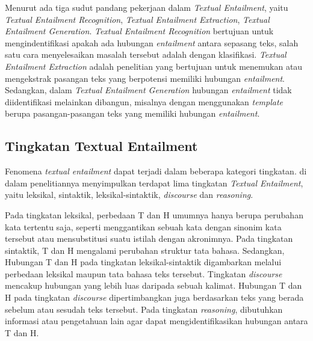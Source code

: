 Menurut \cite{Androutsopoulos:2010:SPT:1892211.1892215} ada tiga sudut pandang pekerjaan dalam \textit{Textual Entailment}, yaitu \textit{Textual Entailment Recognition}, \textit{Textual Entailment Extraction}, \textit{Textual Entailment Generation}. \textit{Textual Entailment Recognition} bertujuan untuk mengindentifikasi apakah ada hubungan \textit{entailment} antara sepasang teks, salah satu cara menyelesaikan masalah tersebut adalah dengan klasifikasi. \textit{Textual Entailment Extraction} adalah penelitian yang bertujuan untuk menemukan atau mengekstrak pasangan teks yang berpotensi memiliki hubungan \textit{entailment}. Sedangkan, dalam \textit{Textual Entailment Generation} hubungan \textit{entailment} tidak diidentifikasi melainkan dibangun, misalnya dengan menggunakan \textit{template} berupa pasangan-pasangan teks yang memiliki hubungan \textit{entailment}.

	\subsection{Tingkatan Textual Entailment}
	Fenomena \textit{textual entailment} dapat terjadi dalam beberapa kategori tingkatan. \cite{BENTIVOGLI10.478} di dalam penelitiannya menyimpulkan terdapat lima tingkatan \textit{Textual Entailment}, yaitu leksikal, sintaktik, leksikal-sintaktik, \textit{discourse} dan \textit{reasoning}. 
		
	Pada tingkatan leksikal, perbedaan T dan H umumnya hanya berupa perubahan kata tertentu saja, seperti menggantikan sebuah kata dengan sinonim kata tersebut atau mensubstitusi suatu istilah dengan akronimnya. Pada tingkatan sintaktik, T dan H mengalami perubahan struktur tata bahasa. Sedangkan, Hubungan T dan H pada tingkatan leksikal-sintaktik digambarkan melalui perbedaan leksikal maupun tata bahasa teks tersebut. Tingkatan \textit{discourse} mencakup hubungan yang lebih luas daripada sebuah kalimat. Hubungan T dan H pada tingkatan \textit{discourse} dipertimbangkan juga berdasarkan teks yang berada sebelum atau sesudah teks tersebut. Pada tingkatan \textit{reasoning}, dibutuhkan informasi atau pengetahuan lain agar dapat mengidentifikasikan hubungan antara T dan H.
	
